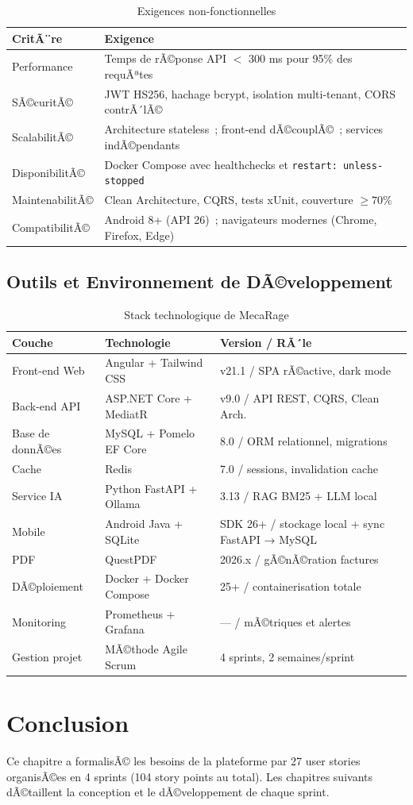 \begin{table}[H]
\centering
\begin{tabularx}{\textwidth}{|l|X|}
\hline
\rowcolor{gray!15}
\textbf{CritÃ¨re} & \textbf{Exigence} \\
\hline
Performance & Temps de rÃ©ponse API $<$ 300 ms pour 95\% des requÃªtes \\[2pt]\hline
SÃ©curitÃ© & JWT HS256, hachage bcrypt, isolation multi-tenant, CORS contrÃ´lÃ© \\[2pt]\hline
ScalabilitÃ© & Architecture stateless~; front-end dÃ©couplÃ©~; services indÃ©pendants \\[2pt]\hline
DisponibilitÃ© & Docker Compose avec healthchecks et \texttt{restart: unless-stopped} \\[2pt]\hline
MaintenabilitÃ© & Clean Architecture, CQRS, tests xUnit, couverture $\geq 70\%$ \\[2pt]\hline
CompatibilitÃ© & Android 8+ (API 26)~; navigateurs modernes (Chrome, Firefox, Edge) \\[2pt]\hline
\end{tabularx}
\caption{Exigences non-fonctionnelles}
\label{tab:enf}
\end{table}

\subsection{Outils et Environnement de DÃ©veloppement}

\begin{table}[H]
\centering
\begin{tabularx}{\textwidth}{|l|l|X|}
\hline
\rowcolor{gray!15}
\textbf{Couche} & \textbf{Technologie} & \textbf{Version / RÃ´le} \\
\hline
Front-end Web & Angular + Tailwind CSS & v21.1 / SPA rÃ©active, dark mode \\[2pt]\hline
Back-end API & ASP.NET Core + MediatR & v9.0 / API REST, CQRS, Clean Arch. \\[2pt]\hline
Base de donnÃ©es & MySQL + Pomelo EF Core & 8.0 / ORM relationnel, migrations \\[2pt]\hline
Cache & Redis & 7.0 / sessions, invalidation cache \\[2pt]\hline
Service IA & Python FastAPI + Ollama & 3.13 / RAG BM25 + LLM local \\[2pt]\hline
Mobile & Android Java + SQLite & SDK 26+ / stockage local + sync FastAPI → MySQL \\[2pt]\hline
PDF & QuestPDF & 2026.x / gÃ©nÃ©ration factures \\[2pt]\hline
DÃ©ploiement & Docker + Docker Compose & 25+ / containerisation totale \\[2pt]\hline
Monitoring & Prometheus + Grafana & --- / mÃ©triques et alertes \\[2pt]\hline
Gestion projet & MÃ©thode Agile Scrum & 4 sprints, 2 semaines/sprint \\[2pt]\hline
\end{tabularx}
\caption{Stack technologique de MecaRage}
\label{tab:stack}
\end{table}

\section{Conclusion}

Ce chapitre a formalisÃ© les besoins de la plateforme par 27 user stories organisÃ©es
en 4 sprints (104 story points au total). Les chapitres suivants dÃ©taillent la
conception et le dÃ©veloppement de chaque sprint.
